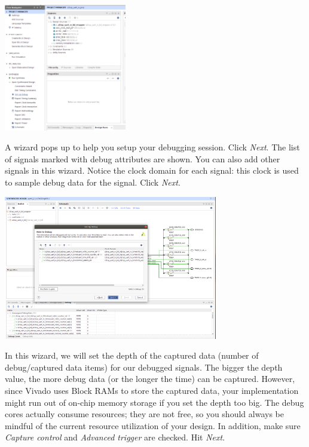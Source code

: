 \documentclass[11pt]{article}
\begin{document}
\begin{center}
\includegraphics[width=0.4\textwidth]{figs/vivado-ila-1.png}
\end{center}

A wizard pops up to help you setup your debugging session. Click \emph{Next}. The list of signals marked with debug attributes are shown. You can also add other signals in this wizard. Notice the clock domain for each signal: this clock is used to sample debug data for the signal. Click \emph{Next}.

\begin{center}
\includegraphics[width=0.7\textwidth]{figs/vivado-ila-2.png}
\end{center}

In this wizard, we will set the depth of the captured data (number of debug/captured data items) for our debugged signals. The bigger the depth value, the more debug data (or the longer the time) can be captured. However, since Vivado uses Block RAMs to store the captured data, your implementation might run out of on-chip memory storage if you set the depth too big. The debug cores actually consume resources; they are not free, so you should always be mindful of the current resource utilization of your design. In addition, make sure \emph{Capture control} and \emph{Advanced trigger} are checked. Hit \emph{Next}.
\end{document}
